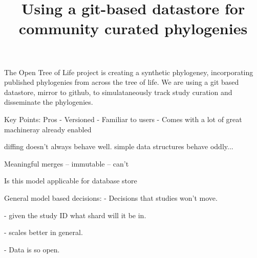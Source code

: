 \documentclass[a4paper,10pt]{article}
\title{Using a git-based datastore for community curated phylogenies}
\author{}
\begin{document}
\maketitle

\begin{abstract}

\end{abstract}

\section{}
The Open Tree of Life project is creating a synthetic phylogeney, incorporating published phylogenies from across the tree of life.
We are using a git based datastore, mirror to github, to simulataneously track study curation and disseminate the phylogenies.


Key Points:
Pros
 - Versioned
 - Familiar to users
 - Comes with a lot of great machineray already enabled

diffing doesn't always behave well.
simple data structures behave oddly...

Meaningful merges
 -- immutable
 -- can't

Is this model applicable for database store

General model based decisions:
- Decisions that studies won't move.

- given the study ID what shard will it be in.

- scales better in general.

- Data is so open.
\end{document}
